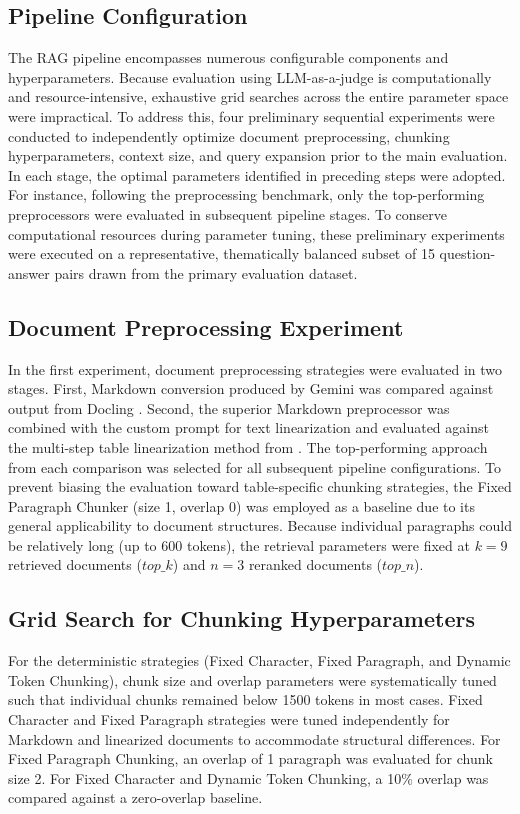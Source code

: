 \documentclass[12pt]{article} %
\begin{document}
\subsection{Pipeline Configuration}
The RAG pipeline encompasses numerous configurable components and hyperparameters. Because evaluation using LLM-as-a-judge is computationally and resource-intensive, exhaustive grid searches across the entire parameter space were impractical. To address this, four preliminary sequential experiments were conducted to independently optimize document preprocessing, chunking hyperparameters, context size, and query expansion prior to the main evaluation. In each stage, the optimal parameters identified in preceding steps were adopted. For instance, following the preprocessing benchmark, only the top-performing preprocessors were evaluated in subsequent pipeline stages. To conserve computational resources during parameter tuning, these preliminary experiments were executed on a representative, thematically balanced subset of 15 question-answer pairs drawn from the primary evaluation dataset.

\subsection{Document Preprocessing Experiment}
In the first experiment, document preprocessing strategies were evaluated in two stages. First, Markdown conversion produced by Gemini was compared against output from Docling \parencite{Docling}. Second, the superior Markdown preprocessor was combined with the custom prompt for text linearization and evaluated against the multi-step table linearization method from \textcite{min2024exploring}. The top-performing approach from each comparison was selected for all subsequent pipeline configurations. To prevent biasing the evaluation toward table-specific chunking strategies, the Fixed Paragraph Chunker (size 1, overlap 0) was employed as a baseline due to its general applicability to document structures. Because individual paragraphs could be relatively long (up to 600 tokens), the retrieval parameters were fixed at $k = 9$ retrieved documents ($top\_k$) and $n = 3$ reranked documents ($top\_n$).

\subsection{Grid Search for Chunking Hyperparameters}
For the deterministic strategies (Fixed Character, Fixed Paragraph, and Dynamic Token Chunking), chunk size and overlap parameters were systematically tuned such that individual chunks remained below 1500 tokens in most cases. Fixed Character and Fixed Paragraph strategies were tuned independently for Markdown and linearized documents to accommodate structural differences. For Fixed Paragraph Chunking, an overlap of 1 paragraph was evaluated for chunk size 2. For Fixed Character and Dynamic Token Chunking, a 10\% overlap was compared against a zero-overlap baseline.
\end{document}
